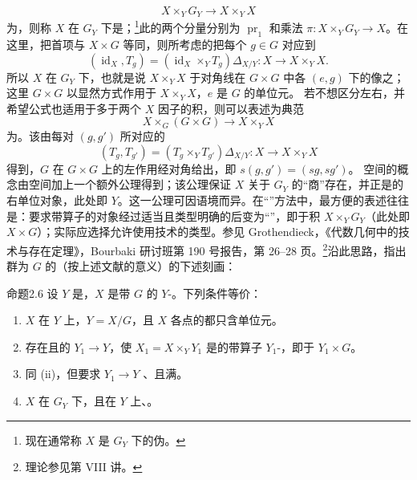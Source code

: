 \[X\times_YG_Y\longrightarrow X\times_YX\]
为，则称 $X$ 在 $G_Y$ 下是；\footnote{现在通常称 $X$ 是 $G_Y$ 下的伪。}此的两个分量分别为 $\operatorname{pr}_1$ 和乘法 $\pi:X\times_YG_Y\to X$。在这里，把首项与 $X\times G$ 等同，则所考虑的把每个 $g\in G$ 对应到
\[(\operatorname{id}_X,T_g)=(\operatorname{id}_X\times_YT_g)\Delta_{X/Y}:X\longrightarrow X\times_YX.\]
所以 $X$ 在 $G_Y$ 下，也就是说 $X\times_YX$ 于对角线在 $G\times G$ 中各 $(e,g)$ 下的像之；这里 $G\times G$ 以显然方式作用于 $X\times_YX$，$e$ 是 $G$ 的单位元。
若不想区分左右，并希望公式也适用于多于两个 $X$ 因子的积，则可以表述为典范
\[X\times_G(G\times G)\longrightarrow X\times_YX\]
为。该由每对 $(g,g')$ 所对应的
\[(T_g,T_{g'})=(T_g\times_YT_{g'})\Delta_{X/Y}:X\longrightarrow X\times_YX\]
得到，$G$ 在 $G\times G$ 上的左作用经对角给出，即 $s(g,g')=(sg,sg')$。
空间的概念由空间加上一个额外公理得到；该公理保证 $X$ 关于 $G_Y$ 的“商”存在，并正是的右单位对象，此处即 $Y$。这一公理可因语境而异。在“”方法中，最方便的表述往往是：要求带算子的对象经过适当且类型明确的后变为“”，即于积 $X\times_YG_Y$（此处即 $X\times G$）；实际应选择允许使用技术的类型。参见 Grothendieck，《代数几何中的技术与存在定理》，Bourbaki 研讨班第 190 号报告，第 26--28 页。\footnote{理论参见第 VIII 讲。}沿此思路，指出群为 $G$ 的（按上述文献的意义）的下述刻画：
\begin{SGAresult}{命题}{2.6}
设 $Y$ 是，$X$ 是带 $G$ 的 $Y$-。下列条件等价：
\begin{enumerate}
\item[(i)] $X$ 在 $Y$ 上，$Y=X/G$，且 $X$ 各点的都只含单位元。
\item[(ii)] 存在且的 $Y_1\to Y$，使 $X_1=X\times_YY_1$ 是的带算子 $Y_1$-，即于 $Y_1\times G$。
\item[(ii bis)] 同 (ii)，但要求 $Y_1\to Y$ 、且满。
\item[(iii)] $X$ 在 $G_Y$ 下，且在 $Y$ 上、。
\end{enumerate}
\end{SGAresult}
